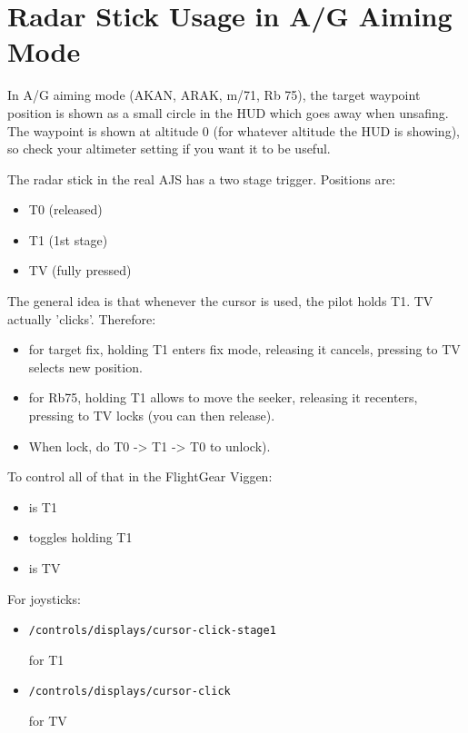 \section{Radar Stick Usage in A/G Aiming Mode}
In A/G aiming mode (AKAN, ARAK, m/71, Rb 75), the target waypoint position is shown as a small circle in the HUD which goes away when unsafing. The waypoint is shown at altitude 0 (for whatever altitude the HUD is showing), so check your altimeter setting if you want it to be useful.

The radar stick in the real AJS has a two stage trigger. Positions are:
\begin{itemize}[nosep]
  \item T0 (released)
  \item T1 (1st stage)
  \item TV (fully pressed)
\end{itemize}

The general idea is that whenever the cursor is used, the pilot holds T1. TV actually 'clicks'. Therefore:
\begin{itemize}[nosep]
  \item for target fix, holding T1 enters fix mode, releasing it cancels, pressing to TV selects new position.
  \item for Rb75, holding T1 allows to move the seeker, releasing it recenters, pressing to TV locks (you can then release).
  \item When lock, do T0 -> T1 -> T0 to unlock).
\end{itemize}

To control all of that in the FlightGear Viggen:
\begin{itemize}[nosep]
  \item {} is T1
  \item {} toggles holding T1
  \item {} is TV
\end{itemize}

For joysticks:
\begin{itemize}[nosep]
  \item \begin{alltt}/controls/displays/cursor-click-stage1\end{alltt} for T1
  \item \begin{alltt}/controls/displays/cursor-click\end{alltt} for TV
\end{itemize}

